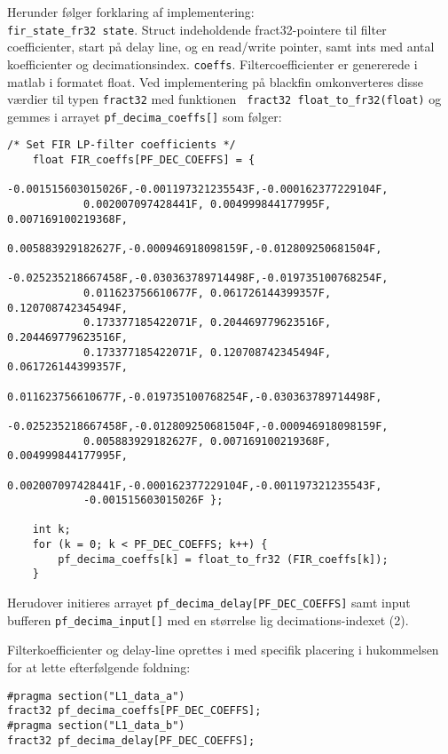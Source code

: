 Herunder følger forklaring af implementering: \\
\verb+fir_state_fr32 state+. Struct indeholdende fract32-pointere til filter coefficienter, start på delay line, og en read/write pointer, samt ints med antal koefficienter og decimationsindex. 
\verb+coeffs+. Filtercoefficienter er genererede i matlab i formatet float. Ved implementering på blackfin omkonverteres disse værdier til typen \verb+fract32+ med funktionen \verb+ fract32 float_to_fr32(float)+ og gemmes i arrayet \verb+pf_decima_coeffs[]+ som følger:
\begin{verbatim}
/* Set FIR LP-filter coefficients */
	float FIR_coeffs[PF_DEC_COEFFS] = {
			-0.001515603015026F,-0.001197321235543F,-0.000162377229104F,
			0.002007097428441F, 0.004999844177995F, 0.007169100219368F,
			0.005883929182627F,-0.000946918098159F,-0.012809250681504F,
			-0.025235218667458F,-0.030363789714498F,-0.019735100768254F,
			0.011623756610677F, 0.061726144399357F, 0.120708742345494F,
			0.173377185422071F, 0.204469779623516F, 0.204469779623516F,
			0.173377185422071F, 0.120708742345494F, 0.061726144399357F,
			0.011623756610677F,-0.019735100768254F,-0.030363789714498F,
			-0.025235218667458F,-0.012809250681504F,-0.000946918098159F,
			0.005883929182627F, 0.007169100219368F, 0.004999844177995F,
			0.002007097428441F,-0.000162377229104F,-0.001197321235543F,
			-0.001515603015026F	};

	int k;
	for (k = 0; k < PF_DEC_COEFFS; k++) {
		pf_decima_coeffs[k] = float_to_fr32 (FIR_coeffs[k]);
	}
\end{verbatim}
Herudover initieres arrayet \verb+pf_decima_delay[PF_DEC_COEFFS]+ samt input bufferen \verb+pf_decima_input[]+ med en størrelse lig decimations-indexet (2).

Filterkoefficienter og delay-line oprettes i med specifik placering i hukommelsen for at lette efterfølgende foldning:
\begin{verbatim}
#pragma section("L1_data_a")
fract32 pf_decima_coeffs[PF_DEC_COEFFS];
#pragma section("L1_data_b")
fract32 pf_decima_delay[PF_DEC_COEFFS];
\end{verbatim}

